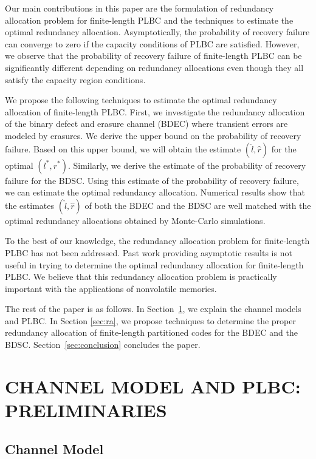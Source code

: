 \documentclass[10pt,twocolumn,twoside,submit]{JCNtran}
\begin{document}
 	Our main contributions in this paper are the formulation of redundancy allocation problem for finite-length PLBC and the techniques to estimate the optimal redundancy allocation. Asymptotically, the probability of recovery failure can converge to zero if the capacity conditions of PLBC are satisfied. However, we observe that the probability of recovery failure of finite-length PLBC can be significantly different depending on redundancy allocations even though they all satisfy the capacity region conditions. 
 	
 	We propose the following techniques to estimate the optimal redundancy allocation of finite-length PLBC. First, we investigate the redundancy allocation of the binary defect and erasure channel (BDEC) where transient errors are modeled by erasures. We derive the upper bound on the probability of recovery failure. Based on this upper bound, we will obtain the estimate $(\widehat{l}, \widehat{r})$ for the optimal $(l^{*}, r^{*})$. Similarly, we derive the estimate of the probability of recovery failure for the BDSC. Using this estimate of the probability of recovery failure, we can estimate the optimal redundancy allocation. Numerical results show that the estimates $(\widehat{l}, \widehat{r})$ of both the BDEC and the BDSC are well matched with the optimal redundancy allocations obtained by Monte-Carlo simulations.
	    
    To the best of our knowledge, the redundancy allocation problem for finite-length PLBC has not been addressed. Past work providing asymptotic results is not useful in trying to determine the optimal redundancy allocation for finite-length PLBC. We believe that this redundancy allocation problem is practically important with the applications of nonvolatile memories. 
	
	The rest of the paper is as follows. In Section~\ref{sec:channel}, we explain the channel models and PLBC. In Section \ref{sec:ra}, we propose techniques to determine the proper redundancy allocation of finite-length partitioned codes for the BDEC and the BDSC. Section~\ref{sec:conclusion} concludes the paper.

\section{\uppercase{Channel Model and PLBC: Preliminaries}} \label{sec:channel}

\subsection{Channel Model}
\end{document}
